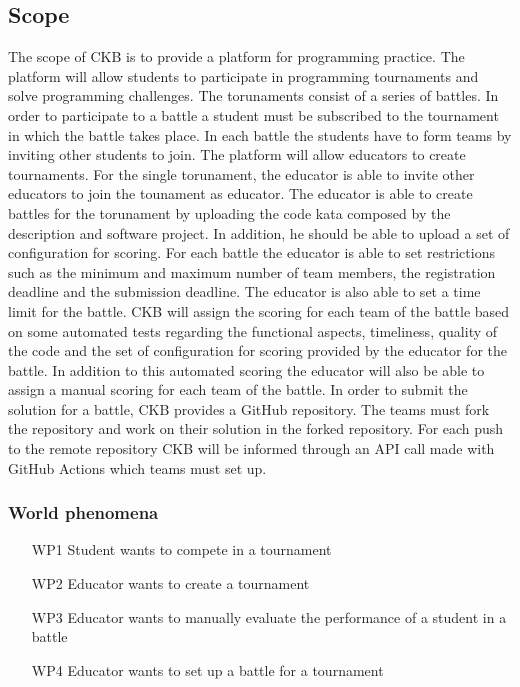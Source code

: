 \subsection{Scope}
The scope of CKB is to provide a platform for programming practice. The platform will allow students to participate in programming tournaments and solve programming challenges. The torunaments consist of a series of battles. In order to participate to a battle a student must be subscribed to the tournament in which the battle takes place. In each battle the students have to form teams by inviting other students to join.
The platform will allow educators to create tournaments. For the single torunament, the educator is able to invite other educators to join the tounament as educator.
The educator is able to create battles for the torunament by uploading the code kata composed by the description and software project. In addition, he should be able to upload a set of configuration for scoring. For each battle the educator is able to set restrictions such as the minimum and maximum number of team members, the registration deadline and the submission deadline. The educator is also able to set a time limit for the battle.
CKB will assign the scoring for each team of the battle based on some automated tests regarding the functional aspects, timeliness, quality of the code and the set of configuration for scoring provided by the educator for the battle. In addition to this automated scoring the educator will also be able to assign a manual scoring for each team of the battle.
In order to submit the solution for a battle, CKB provides a GitHub repository. The teams must fork the repository and work on their solution in the forked repository. For each push to the remote repository CKB will be informed through an API call made with GitHub Actions which teams must set up.

\subsubsection{World phenomena}
\begin{itemize}
    \item[WP1] Student wants to compete in a tournament
    \item[WP2] Educator wants to create a tournament
    \item[WP3] Educator wants to manually evaluate the performance of a student in a battle 
    \item[WP4] Educator wants to set up a battle for a tournament
\end{itemize}
